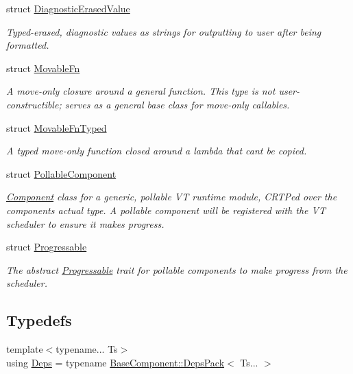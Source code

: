 \begin{DoxyCompactItemize}
struct \hyperlink{structvt_1_1runtime_1_1component_1_1_diagnostic_erased_value}{Diagnostic\+Erased\+Value}
\begin{DoxyCompactList}\small\item\em Typed-\/erased, diagnostic values as strings for outputting to user after being formatted. \end{DoxyCompactList}\item 
struct \hyperlink{structvt_1_1runtime_1_1component_1_1_movable_fn}{Movable\+Fn}
\begin{DoxyCompactList}\small\item\em A move-\/only closure around a general function. This type is not user-\/constructible; serves as a general base class for move-\/only callables. \end{DoxyCompactList}\item 
struct \hyperlink{structvt_1_1runtime_1_1component_1_1_movable_fn_typed}{Movable\+Fn\+Typed}
\begin{DoxyCompactList}\small\item\em A typed move-\/only function closed around a lambda that can\textquotesingle{}t be copied. \end{DoxyCompactList}\item 
struct \hyperlink{structvt_1_1runtime_1_1component_1_1_pollable_component}{Pollable\+Component}
\begin{DoxyCompactList}\small\item\em {\ttfamily \hyperlink{structvt_1_1runtime_1_1component_1_1_component}{Component}} class for a generic, pollable VT runtime module, C\+R\+TP\textquotesingle{}ed over the component\textquotesingle{}s actual type. A pollable component will be registered with the VT scheduler to ensure it makes progress. \end{DoxyCompactList}\item 
struct \hyperlink{structvt_1_1runtime_1_1component_1_1_progressable}{Progressable}
\begin{DoxyCompactList}\small\item\em The abstract {\ttfamily \hyperlink{structvt_1_1runtime_1_1component_1_1_progressable}{Progressable}} trait for pollable components to make progress from the scheduler. \end{DoxyCompactList}\end{DoxyCompactItemize}
\subsection*{Typedefs}
\begin{DoxyCompactItemize}
\item 
{\footnotesize template$<$typename... Ts$>$ }\\using \hyperlink{namespacevt_1_1runtime_1_1component_afad3a7a92e35d9ab3d81540d9275213c}{Deps} = typename \hyperlink{structvt_1_1runtime_1_1component_1_1_base_component_1_1_deps_pack}{Base\+Component\+::\+Deps\+Pack}$<$ Ts... $>$
\end{DoxyCompactItemize}
